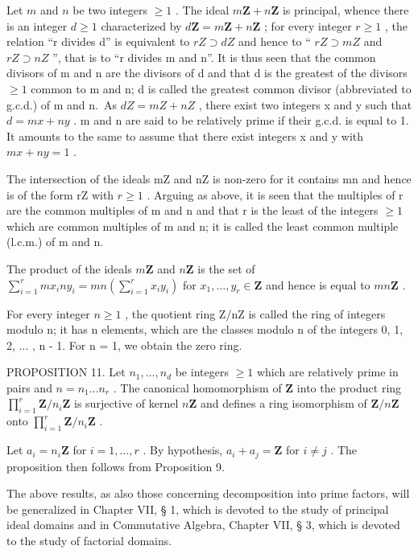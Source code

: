 Let \(m\) and \(n\) be two integers \(\geqslant 1\) . The ideal \(m\mathbf{Z} + n\mathbf{Z}\) is principal, whence there is an integer \(d \geqslant 1\) characterized by \(d\mathbf{Z} = m\mathbf{Z} + n\mathbf{Z}\) ; for every integer \(r \geqslant 1\) , the relation ``r divides d'' is equivalent to \(rZ \supset dZ\) and hence to `` \(rZ \supset mZ\) and \(rZ \supset nZ\) '', that is to ``r divides m and n''. It is thus seen that the common divisors of m and n are the divisors of d and that d is the greatest of the divisors \(\geqslant 1\) common to m and n; d is called the greatest common divisor (abbreviated to g.c.d.) of m and n.~As \(dZ = mZ + nZ\) , there exist two integers x and y such that \(d = mx + ny\) . m and n are said to be relatively prime if their g.c.d. is equal to 1. It amounts to the same to assume that there exist integers x and y with \(mx + ny = 1\) .

The intersection of the ideals mZ and nZ is non-zero for it contains mn and hence is of the form rZ with \(r \geqslant 1\) . Arguing as above, it is seen that the multiples of r are the common multiples of m and n and that r is the least of the integers \(\geqslant 1\) which are common multiples of m and n; it is called the least common multiple (l.c.m.) of m and n.

The product of the ideals \(m\mathbf{Z}\) and \(n\mathbf{Z}\) is the set of \(\sum_{i=1}^{r} mx_i ny_i = mn\left(\sum_{i=1}^{r} x_i y_i\right)\) for \(x_1, \ldots, y_r \in \mathbf{Z}\) and hence is equal to \(mn\mathbf{Z}\) .

For every integer \(n \geqslant 1\) , the quotient ring Z/nZ is called the ring of integers modulo n; it has n elements, which are the classes modulo n of the integers 0, 1, 2, \(\ldots\) , n - 1. For n = 1, we obtain the zero ring.

PROPOSITION 11. Let \(n_1, \ldots, n_d\) be integers \(\geqslant 1\) which are relatively prime in pairs and \(n = n_1 \ldots n_r\) . The canonical homomorphism of \(\mathbf{Z}\) into the product ring \(\prod_{i=1}^{r} \mathbf{Z} / n_i \mathbf{Z}\) is surjective of kernel \(n\mathbf{Z}\) and defines a ring isomorphism of \(\mathbf{Z} / n\mathbf{Z}\) onto \(\prod_{i=1}^{r} \mathbf{Z} / n_i \mathbf{Z}\) .

Let \(a_{i} = n_{i}\mathbf{Z}\) for \(i = 1, \ldots, r\) . By hypothesis, \(a_{i} + a_{j} = \mathbf{Z}\) for \(i \neq j\) . The proposition then follows from Proposition 9.

The above results, as also those concerning decomposition into prime factors, will be generalized in Chapter VII, § 1, which is devoted to the study of principal ideal domains and in Commutative Algebra, Chapter VII, § 3, which is devoted to the study of factorial domains.

